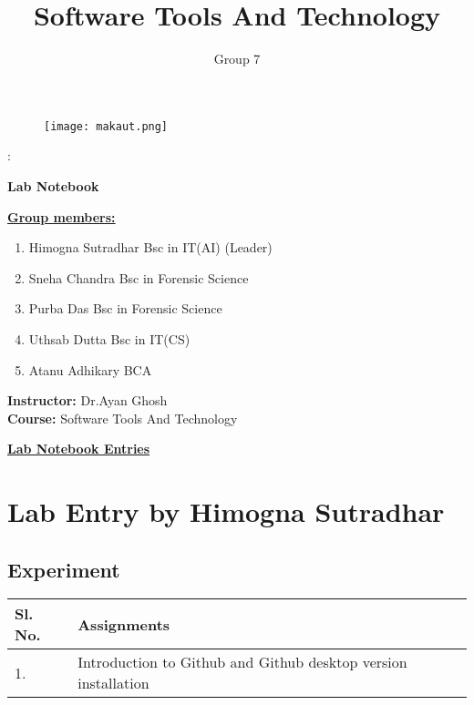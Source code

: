 \documentclass[a4paper,12pt]{article}
\title{\Huge \textbf{Software Tools And Technology}}
\date{}
\author{Group 7}
\begin{document}
\begin{figure}
    \centering
    \texttt{[image: makaut.png]}
\end{figure}
\maketitle
{}:
\begin{center}
\LARGE\textbf{Lab Notebook}
\end{center}
\centering
\vspace{0.5cm}
\bfseries{\underline{Group members:}}
\begin{enumerate}
        \item Himogna Sutradhar Bsc in IT(AI) (Leader)
        \item Sneha Chandra Bsc in Forensic Science
        \item Purba Das Bsc in Forensic Science
        \item Uthsab Dutta Bsc in IT(CS)
        \item Atanu Adhikary  BCA
\end{enumerate}
\vspace{2cm}
 \textbf{Instructor:} Dr.Ayan Ghosh \\
 \textbf{Course:} Software Tools And Technology
\newpage
\usetikzlibrary{calc}
\centering
\begin{center}
\Large{\bfseries\underline{Lab Notebook Entries}}
\end{center}
\vspace{1.5cm}
\section{Lab Entry by Himogna Sutradhar}
\vspace{0.7cm}
\subsection{Experiment}
\vspace{0.5cm}
\begin{table}[ht]
\centering
\begin{tabular}{|p{50pt}|p{200pt}|}
\hline
\textbf{Sl. No.} & \textbf{Assignments} \\ \hline
1. & Introduction to Github and Github desktop version installation \\ \hline
\end{tabular}
\end{table}
\end{document}

